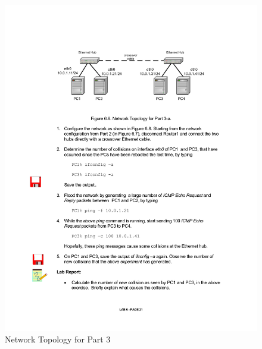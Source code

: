\begin{figure}[h!t]
	\centering
	\includegraphics[width=\linewidth]{graphics/lab6-network3.pdf}	
	\caption{Network Topology for Part 3}
	\label{fig:lab6-network3}
\end{figure}


